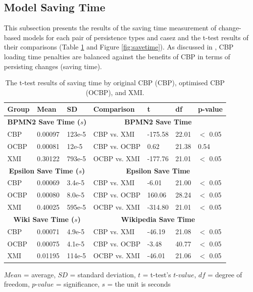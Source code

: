 {  \subsection{Model Saving Time}
  \label{subsec:saving_time_test}
  This subsection presents the results of the saving time measurement of change-based models for each pair of persistence types and casez and the t-test results of their comparisons (Table \ref{table:ttest_results_savetime} and Figure \ref{fig:savetime}). As discussed in \cite{DBLP:conf/models/YohannisKP17}, CBP loading time penalties are balanced against the benefits of CBP in terms of persisting changes (saving time).
  
  \begin{table}[ht]
    \footnotesize
    \centering
    \caption{The t-test results of saving time by original CBP (CBP), optimised CBP (OCBP), and XMI.}
    \label{table:ttest_results_savetime}
    \begin{tabular}
      {|p{}p{}p{}|p{}p{}p{}p{}|}
      \hline
      
      Group & Mean & SD & Comparison & t & df & p-value \\
      \hline
      \multicolumn{3}{|c|}{\textbf{BPMN2 Save Time ($s$)}} & \multicolumn{4}{c|}{\textbf{BPMN2 Save Time}}\\
      CBP & 0.00097 & 123e-5 & CBP vs. XMI & -175.58 & 22.01 & $<$ 0.05 \\
      OCBP & 0.00081 & 12e-5 & CBP vs. OCBP & 0.62 & 21.38 & 0.54 \\
      XMI & 0.30122 & 793e-5 & OCBP vs. XMI & -177.76 & 21.01 & $<$ 0.05 \\
      \hline
      
      \multicolumn{3}{|c|}{\textbf{Epsilon Save Time ($s$)}} & \multicolumn{4}{c|}{\textbf{Epsilon Save Time}}\\
      CBP & 0.00069 & 3.4e-5 & CBP vs. XMI & -6.01 &21.00 & $<$ 0.05 \\
      OCBP & 0.00080 & 8.0e-5 & CBP vs. OCBP & 160.06 & 28.24 & $<$ 0.05 \\
      XMI & 0.40025 & 595e-5 & OCBP vs. XMI & -314.80 & 21.01 & $<$ 0.05 \\
      \hline
      
      \multicolumn{3}{|c|}{\textbf{Wiki Save Time ($s$)}} & \multicolumn{4}{c|}{\textbf{Wikipedia Save Time}}\\
      CBP & 0.00071 & 4.9e-5 & CBP vs. XMI & -46.19 & 21.08 & $<$ 0.05 \\
      OCBP &0.00075 & 4.1e-5 & CBP vs. OCBP & -3.48 & 40.77 & $<$ 0.05 \\
      XMI & 0.01195 & 114e-5 & OCBP vs. XMI & -46.01 & 21.06 & $<$ 0.05 \\
      \hline
    \end{tabular}
    \justify
    $Mean$ = average, $SD$ = standard deviation, $t$ = t-test’s $t$-$value$, $df$ = degree of freedom, $p$-$value$ = significance, $s$ = the unit is seconds
  \end{table}
    
}
